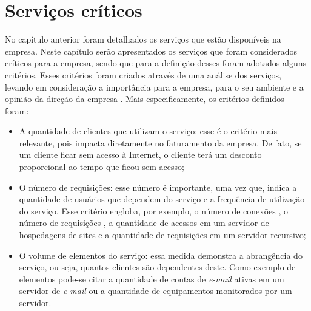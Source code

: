 \chapter{Serviços críticos}
\label{cap:servicoscriticos}

No capítulo anterior foram detalhados os serviços que estão disponíveis na empresa. Neste capítulo serão apresentados os serviços 
que foram considerados críticos para a empresa, sendo que para a definição desses foram adotados alguns critérios. Esses critérios foram criados
através de uma análise dos serviços, levando em consideração a importância para a empresa, para o seu ambiente e a opinião da direção da empresa
\cite{geordano2014}. Mais especificamente, os critérios definidos foram:


\begin{itemize}
 \item A quantidade de clientes que utilizam o serviço: esse é o critério mais relevante, pois impacta diretamente no faturamento
 da empresa. De fato, se um cliente ficar sem acesso à Internet, o cliente terá um desconto proporcional ao tempo que ficou sem 
 acesso; 
 \item O número de requisições: esse número é importante, uma vez que, indica a quantidade de usuários que dependem do serviço e a frequência
 de utilização do serviço. Esse critério engloba, por exemplo, o número de conexões , o número de requisições 
 , a quantidade de acessos em um servidor de hospedagens de sites e a quantidade de requisições  
 em um servidor recursivo;
 \item O volume de elementos do serviço: essa medida demonstra a abrangência do serviço, ou seja, quantos clientes são dependentes deste. 
 Como exemplo de elementos pode-se citar a quantidade de contas de \textit{e-mail} ativas em um servidor de \textit{e-mail} ou a quantidade de 
 equipamentos monitorados por um servidor.
\end{itemize}

